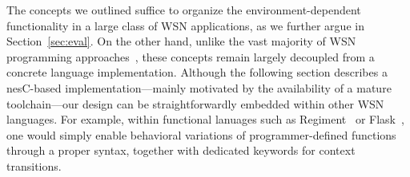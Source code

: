 The concepts we outlined suffice to organize the environment-dependent
functionality in a large class of WSN applications, as we further
argue in Section~\ref{sec:eval}. On the other hand, unlike the vast
majority of WSN programming approaches~\cite{mottola10:survey}, these
concepts remain largely decoupled from a concrete language
implementation. Although the following section describes a nesC-based
implementation---mainly motivated by the availability of a mature
toolchain---our design can be straightforwardly embedded within other
WSN languages. For example, within functional lanuages such as
Regiment~\cite{Newton:2007:RMS:1236360.1236422} or
Flask~\cite{Mainland:2008:FSF:1411204.1411251}, one would simply
enable behavioral variations of programmer-defined functions through a
proper syntax, together with dedicated keywords for context
transitions.






